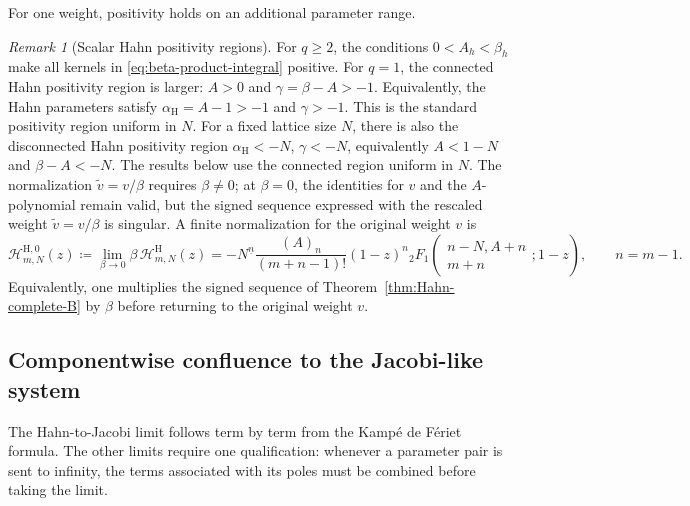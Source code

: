 \documentclass[10pt]{amsart}
\newcommand{\fall}[2]{#1^{\underline{#2}}}
\newcommand{\pFq}[5]{{}_{#1}F_{#2}\!\left(\begin{matrix}#3\\#4\end{matrix};#5\right)}
\theoremstyle{plain}
\theoremstyle{definition}
\theoremstyle{remark}
\newtheorem{remark}[theorem]{Remark}
\begin{document}
For one weight, positivity holds on an additional parameter range.

\begin{remark}[Scalar Hahn positivity regions]
\label{rem:q1-larger-region}
For \(q\ge2\), the conditions
\(0<A_h<\beta_h\) make all kernels in
\eqref{eq:beta-product-integral} positive. For \(q=1\), the connected
Hahn positivity region is larger: \(A>0\) and
\(\gamma=\beta-A>-1\).
Equivalently, the Hahn parameters satisfy
\(\alpha_{\mathrm H}=A-1>-1\) and \(\gamma>-1\). This is the standard
positivity region uniform in \(N\). For a fixed lattice size \(N\), there
is also the disconnected Hahn positivity region
\(\alpha_{\mathrm H}<-N\), \(\gamma<-N\),
equivalently \(A<1-N\) and \(\beta-A<-N\). The results below use the
connected region uniform in \(N\). The normalization
\(\widetilde v=v/\beta\) requires \(\beta\ne0\); at \(\beta=0\), the
identities for \(v\) and the \(A\)-polynomial remain valid, but the signed
sequence expressed with the rescaled weight \(\widetilde v=v/\beta\) is
singular. A finite normalization for the original weight \(v\) is
  \[
   \mathcal H^{\mathrm H,0}_{m,N}(z)
   \coloneq\lim_{\beta\to0}\beta\,
   \mathcal H^{\mathrm H}_{m,N}(z)
   =-\fall{N}{n}\frac{(A)_n}{(m+n-1)!}(1-z)^n
   \pFq{2}{1}{n-N,A+n}{m+n}{1-z},
   \qquad n=m-1.
  \]
Equivalently, one multiplies the signed sequence of
Theorem~\ref{thm:Hahn-complete-B} by \(\beta\) before returning to the
original weight \(v\).
\end{remark}


\subsection{Componentwise confluence to the Jacobi-like system}
\label{subsec:type-I-special-function-confluence}

The Hahn-to-Jacobi limit follows term by term from the Kamp\'e de F\'eriet formula.
The other limits require one qualification: whenever a parameter pair is
sent to infinity, the terms associated with its poles must be combined
before taking the limit.
\end{document}
